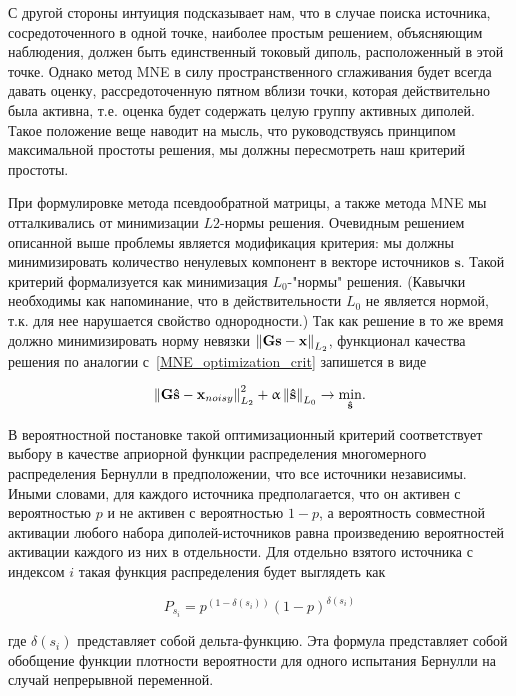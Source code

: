 С другой стороны интуиция подсказывает нам, что в случае поиска источника,
сосредоточенного в одной точке, наиболее простым решением, объясняющим
наблюдения, должен быть единственный токовый диполь, расположенный в этой
точке. Однако метод MNE в силу пространственного сглаживания будет всегда
давать оценку, рассредоточенную пятном вблизи точки, которая действительно была
активна, т.е. оценка будет содержать целую группу активных диполей.
Такое положение веще наводит на мысль, что руководствуясь принципом
максимальной простоты решения, мы должны пересмотреть наш критерий простоты.

При формулировке метода псевдообратной матрицы, а также метода MNE мы
отталкивались от минимизации $L2$-нормы решения. Очевидным решением описанной
выше проблемы является модификация критерия: мы должны минимизировать
количество ненулевых компонент в векторе источников $\mathbf{s}$. Такой
критерий формализуется как минимизация $L_0$-"нормы" решения.  (Кавычки
необходимы как напоминание, что в действительности $L_0$ не является нормой,
т.к. для нее нарушается свойство однородности.) Так как решение в то же время
должно минимизировать норму невязки $\left\lVert\mathbf{Gs - x}\right\rVert_{L_2}$, функционал
качества решения по аналогии с~\ref{MNE_optimization_crit} запишется в виде

\begin{equation}
    \left\lVert\mathbf{G\hat{s} - x}_{noisy}\right\rVert^2_{L_2} + \upalpha\left\lVert\mathbf{\hat{s}}\right\rVert_{L_0}
    \rightarrow \underset{\mathbf{\hat{s}}}{\min}.
    \label{l0_optimization_crit}
\end{equation}

В вероятностной постановке такой оптимизационный критерий соответствует
выбору в качестве априорной функции распределения многомерного распределения
Бернулли в предположении, что все источники независимы. Иными словами,
для каждого источника предполагается, что он активен с вероятностью
$p$ и не активен с вероятностью $1-p$, а вероятность совместной активации
любого набора диполей-источников равна произведению вероятностей активации
каждого из них в отдельности.
Для отдельно взятого источника с индексом
$i$ такая функция распределения будет выглядеть как

\begin{equation}
    P_{s_i} = p^{(1 - \delta(s_i))} (1-p)^{\delta(s_i)}
\end{equation}

где $\delta(s_i)$ представляет собой дельта-функцию. Эта формула представляет
собой обобщение функции плотности вероятности для одного испытания Бернулли
на случай непрерывной переменной.

